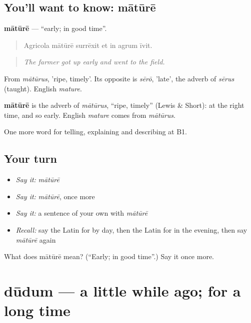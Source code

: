 \subsection*{You'll want to know: mātūrē}
\textbf{mātūrē} — \textquotedblleft{}early; in good time\textquotedblright{}.

\begin{quote}
Agricola mātūrē surrēxit et in agrum īvit.
\end{quote}

\begin{quote}
\emph{The farmer got up early and went to the field.}
\end{quote}

From \emph{mātūrus}, 'ripe, timely'. Its opposite is \emph{sērō}, 'late', the adverb of \emph{sērus} (taught). English \emph{mature}.

\begin{cousinweb}
\textbf{mātūrē} is the adverb of \emph{mātūrus}, \textquotedblleft{}ripe, timely\textquotedblright{} (Lewis \& Short): at the right time, and so early. English \emph{mature} comes from \emph{mātūrus}.
\end{cousinweb}

\begin{grammarlens}[title={What you've built}]
One more word for telling, explaining and describing at B1.
\end{grammarlens}

\subsection*{Your turn}
\begin{itemize}
\raggedright
  \item \emph{Say it:} \emph{mātūrē}
  \item \emph{Say it:} \emph{mātūrē}, once more
  \item \emph{Say it:} a sentence of your own with \emph{mātūrē}
  \item \emph{Recall:} say the Latin for by day, then the Latin for in the evening, then say \emph{mātūrē} again
\end{itemize}

\begin{tcolorbox}[breakable,colback=teal!4,colframe=teal!35!black,title={Before you move on}]
What does mātūrē mean? (\textquotedblleft{}Early; in good time\textquotedblright{}.) Say it once more.
\end{tcolorbox}
\section[dūdum]{dūdum — a little while ago; for a long time}


